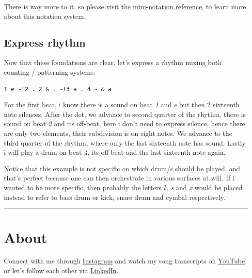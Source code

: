 \documentclass[
]{book}
\begin{document}
There is way more to it, so please visit the \href{https://tidalcycles.org/docs/reference/mini_notation}{mini-notation reference}, to learn more about this notation system.

\section*{Express rhythm}\label{express-rhythm}

Now that these foundations are clear, let's express a rhythm mixing both counting / patterning systems:

\texttt{1\ e\ \textasciitilde{}!2\ .\ 2\ \&\ .\ \textasciitilde{}!3\ a\ .\ 4\ \textasciitilde{}\ \&\ a}

For the first beat, i know there is a sound on beat \emph{1} and \emph{e} but then 2 sixteenth note silences. After the dot, we advance to second quarter of the rhythm, there is sound on beat \emph{2} and its off-beat, here i don't need to express silence, hence there are only two elements, their subdivision is on eight notes. We advance to the third quarter of the rhythm, where only the last sixteenth note has sound. Lastly i will play a drum on beat \emph{4}, its off-beat and the last sixteenth note again.

Notice that this example is not specific on which drum/s should be played, and that's perfect because one can then orchestrate in various surfaces at will. If i wanted to be more specific, then probably the letters \emph{k}, \emph{s} and \emph{x} would be placed instead to refer to bass drum or kick, snare drum and cymbal respectively.

\begin{center}\rule{0.5\linewidth}{0.5pt}\end{center}

\chapter{About}\label{About}

Connect with me through \href{https://www.instagram.com/isaac.medina/}{Instagram} and watch my song transcripts on \href{https://www.youtube.com/@drumathics}{YouTube} or let's follow each other via \href{https://mx.linkedin.com/in/isaacmedina/es}{LinkedIn}.

  
\end{document}
